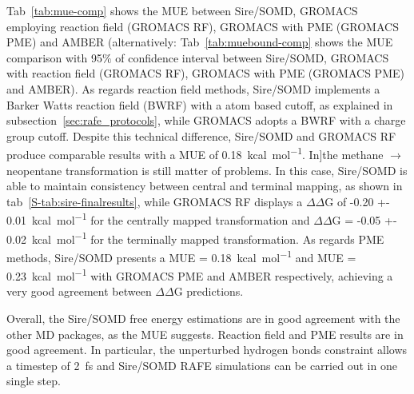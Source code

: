 \documentclass[journal=jctcce,manuscript=article]{achemso}
\begin{document}
Tab~\ref{tab:mue-comp} shows the MUE between Sire/SOMD, GROMACS employing 
reaction field (GROMACS RF), GROMACS with PME (GROMACS PME) and AMBER  
(alternatively: Tab~\ref{tab:muebound-comp} shows the MUE comparison with 
95$\%$ of confidence interval between Sire/SOMD, GROMACS with reaction 
field (GROMACS RF), GROMACS with PME (GROMACS PME) and AMBER). 
As regards reaction field methods, Sire/SOMD implements a Barker Watts reaction 
field (BWRF) with a atom based cutoff, as explained in 
subsection~\ref{sec:rafe_protocols}, while GROMACS adopts a BWRF with a
charge group cutoff.  Despite this technical difference,
Sire/SOMD and GROMACS RF produce comparable results with a MUE of 
\SI{0.18}{kcal.mol^{-1}}.
In]the methane $\rightarrow$ neopentane transformation is still matter of 
problems. In this case, Sire/SOMD is able to maintain consistency between 
central and terminal mapping, as shown in tab~\ref{S-tab:sire-finalresults}, 
while GROMACS RF displays a $\Delta\Delta$G of \SI{-0.20 +- 
0.01}{kcal.mol^{-1}} for the
centrally mapped transformation and $\Delta\Delta$G = \SI{-0.05 +- 
0.02}{kcal.mol^{-1}} for the terminally mapped transformation.
As regards PME methods, Sire/SOMD presents a MUE = \SI{0.18}{kcal.mol^{-1}} and 
MUE = \SI{0.23}{kcal.mol^{-1}} with GROMACS PME and AMBER respectively, 
achieving a very good agreement between $\Delta\Delta$G predictions. 



Overall, the Sire/SOMD free energy estimations are in good agreement with the 
other MD packages, as the MUE suggests.  Reaction field and PME results are in 
good agreement.  In particular, the unperturbed hydrogen bonds constraint 
allows a timestep of \SI{2}{fs} and Sire/SOMD RAFE simulations can be carried 
out in one 
single step.
\end{document}

